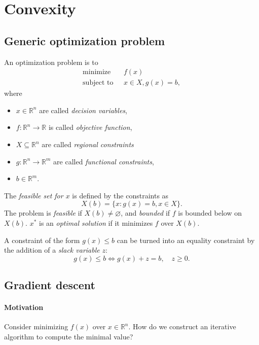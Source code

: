 \section{Convexity}
\subsection{Generic optimization problem}

\begin{definition}
    An optimization problem is to 
    \begin{align*}
        \text{minimize}\ \ \ & f(x)\\ 
        \text{subject to}\ \ \ & x\in X, g(x) = b, 
    \end{align*}
    where
    \begin{itemize}
        \item $ x\in \mathbb{R}^{n} $ are called \textit{decision variables},
        \item $ f: \mathbb{R}^{n}\to \mathbb{R} $ is called \textit{objective function},
        \item $ X \subseteq \mathbb{R}^{n} $ are called \textit{regional constraints}
        \item $ g: \mathbb{R}^{n} \to \mathbb{R}^{m} $ are called \textit{functional constraints},
        \item $ b\in \mathbb{R}^{m} $. 
    \end{itemize}
\end{definition}
\begin{definition}
    The \textit{feasible set for $x$} is defined by the constraints as 
    \[
        X(b) = \{x: g(x)=b,x\in X\}. 
    \]
    The problem is \textit{feasible} if $X(b)\neq \varnothing$, and \textit{bounded} if $f$ is bounded below on $X(b)$. $ x^* $ is an \textit{optimal solution} if it minimizes $f$ over $X(b)$.
\end{definition}
\begin{note}
    A constraint of the form $ g(x)\le b $ can be turned into an equality constraint by the addition of a \textit{slack variable} $z$:
    \[
        g(x)\le b \iff g(x) + z = b,\quad z\ge 0.
    \]
\end{note}

\subsection{Gradient descent}
\paragraph{Motivation}
Consider minimizing $f(x)$ over $ x\in \mathbb{R}^{n} $. How do we construct an iterative algorithm to compute the minimal value?

